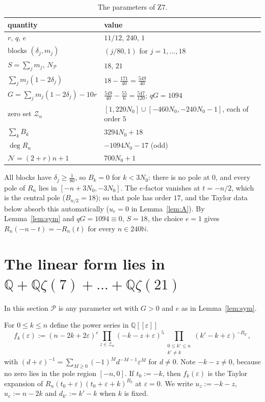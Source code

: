 \documentclass[11pt]{amsart}
\theoremstyle{definition}
\theoremstyle{remark}
\numberwithin{equation}{section}
\newcommand{\NN}{\mathbb{N}}
\newcommand{\QQ}{\mathbb{Q}}
\newcommand{\cN}{\mathcal{N}}
\newcommand{\cP}{\mathcal{P}}
\newcommand{\eps}{\varepsilon}
\begin{document}
\begin{table}[ht]
\centering
\begin{tabular}{@{}p{}p{}@{}}
\toprule
quantity & value\\
\midrule
$r$, $q$, $e$ & $11/12$, $240$, $1$\\
blocks $(\delta_j,m_j)$ & $(j/80,1)$ for $j=1,\dots,18$\\
$S=\sum_jm_j$, $N_\cP$ & $18$, $21$\\
$\sum_jm_j(1-2\delta_j)$ & $18-\frac{171}{40}=\frac{549}{40}$\\
$G=\sum_jm_j(1-2\delta_j)-10r$ & $\frac{549}{40}-\frac{55}{6}=\frac{547}{120}$; $qG=1094$\\
zero set $\mathcal Z_n$ & $[1,220N_0]\cup[-460N_0,-240N_0-1]$, each of order $5$\\
$\sum_kB_k$ & $3294N_0+18$\\
$\deg R_n$ & $-1094N_0-17$ (odd)\\
$\cN=(2+r)n+1$ & $700N_0+1$\\
\bottomrule
\end{tabular}
\caption{The parameters of Z7.}\label{tab:blocks}
\end{table}

All blocks have $\delta_j\ge\frac1{80}$, so $B_k=0$ for $k<3N_0$: there is no pole at $0$, and every pole of
$R_n$ lies in $[-n+3N_0,-3N_0]$. The $e$-factor vanishes at $t=-n/2$, which is the central pole ($B_{n/2}=18$);
so that pole has order $17$, and the Taylor data below absorb this automatically ($u_e=0$ in
Lemma~\ref{lem:A}). By Lemma~\ref{lem:sym} and $qG=1094\equiv0$, $S=18$, the choice $e=1$ gives
$R_n(-n-t)=-R_n(t)$ for every $n\in240\NN$.

\section{\texorpdfstring{The linear form lies in $\QQ+\QQ\zeta(7)+\dots+\QQ\zeta(21)$}{The linear form lies in Q + Q zeta(7) + ... + Q zeta(21)}}\label{sec:algebra}

In this section $\cP$ is any parameter set with $G>0$ and $e$ as in Lemma~\ref{lem:sym}.

For $0\le k\le n$ define the power series in $\QQ[[\eps]]$
\begin{equation}\label{eq:fk}
  f_k(\eps):=(n-2k+2\eps)^e\prod_{z\in\mathcal Z_n}(-k-z+\eps)^5\prod_{\substack{0\le k'\le n\\k'\ne k}}(k'-k+\eps)^{-B_{k'}},
\end{equation}
with $(d+\eps)^{-1}=\sum_{M\ge0}(-1)^Md^{-M-1}\eps^M$ for $d\ne0$. Note $-k-z\ne0$, because no zero lies in
the pole region $[-n,0]$. If $t_0:=-k$, then $f_k(\eps)$ is the Taylor expansion of $R_n(t_0+\eps)(t_0+\eps+k)^{B_k}$
at $\eps=0$. We write $u_z:=-k-z$, $u_e:=n-2k$ and $d_{k'}:=k'-k$ when $k$ is fixed.
\end{document}
